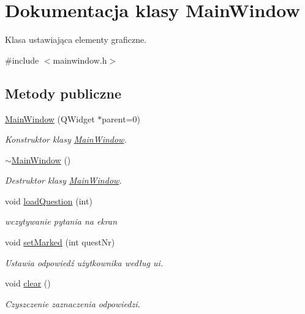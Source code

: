 \hypertarget{classMainWindow}{\section{\-Dokumentacja klasy \-Main\-Window}
\label{classMainWindow}
}


\-Klasa ustawiająca elementy graficzne.  




{\ttfamily \#include $<$mainwindow.\-h$>$}

\subsection*{\-Metody publiczne}
\begin{DoxyCompactItemize}
\item 
\hypertarget{classMainWindow_a8b244be8b7b7db1b08de2a2acb9409db}{\hyperlink{classMainWindow_a8b244be8b7b7db1b08de2a2acb9409db}{\-Main\-Window} (\-Q\-Widget $\ast$parent=0)}\label{classMainWindow_a8b244be8b7b7db1b08de2a2acb9409db}

\begin{DoxyCompactList}\small\item\em \-Konstruktor klasy \hyperlink{classMainWindow}{\-Main\-Window}. \end{DoxyCompactList}\item 
\hypertarget{classMainWindow_ae98d00a93bc118200eeef9f9bba1dba7}{\hyperlink{classMainWindow_ae98d00a93bc118200eeef9f9bba1dba7}{$\sim$\-Main\-Window} ()}\label{classMainWindow_ae98d00a93bc118200eeef9f9bba1dba7}

\begin{DoxyCompactList}\small\item\em \-Destruktor klasy \hyperlink{classMainWindow}{\-Main\-Window}. \end{DoxyCompactList}\item 
void \hyperlink{classMainWindow_a566c91cfbb83c75e0ff2d9e6fafbe013}{load\-Question} (int)
\begin{DoxyCompactList}\small\item\em wczytywanie pytania na ekran \end{DoxyCompactList}\item 
void \hyperlink{classMainWindow_a9e97d261839fa7a340b30bda6f3bc2b0}{set\-Marked} (int quest\-Nr)
\begin{DoxyCompactList}\small\item\em \-Ustawia odpowiedź użytkownika według ui. \end{DoxyCompactList}\item 
\hypertarget{classMainWindow_aa787c9a816550a846e9d26d503ea03d3}{void \hyperlink{classMainWindow_aa787c9a816550a846e9d26d503ea03d3}{clear} ()}\label{classMainWindow_aa787c9a816550a846e9d26d503ea03d3}

\begin{DoxyCompactList}\small\item\em \-Czyszczenie zaznaczenia odpowiedzi. \end{DoxyCompactList}\end{DoxyCompactItemize}
